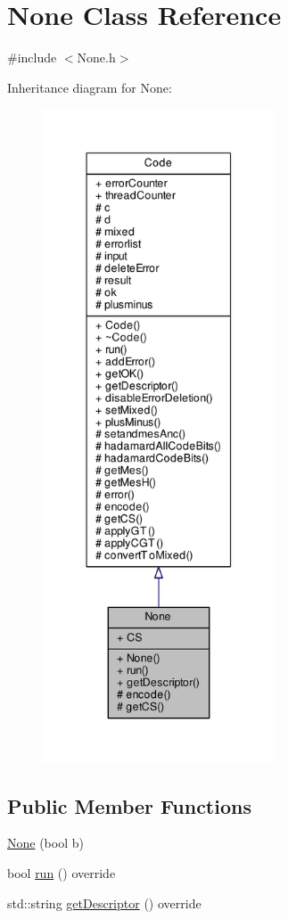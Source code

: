 \hypertarget{class_none}{}\section{None Class Reference}
\label{class_none}


{\ttfamily \#include $<$None.\+h$>$}



Inheritance diagram for None\+:
\nopagebreak
\begin{figure}[H]
\begin{center}
\leavevmode
\includegraphics[height=550pt]{class_none__inherit__graph}
\end{center}
\end{figure}
\subsection*{Public Member Functions}
\begin{DoxyCompactItemize}
\item 
\hyperlink{class_none_a57e854dd2b23d85d5476402f85b47ea0}{None} (bool b)
\item 
bool \hyperlink{class_none_aa8386e7d54637a7fd089bb84b5518c9d}{run} () override
\item 
std\+::string \hyperlink{class_none_a0ad5c4d177835a8fc0498d606fefbd79}{get\+Descriptor} () override
\end{DoxyCompactItemize}
